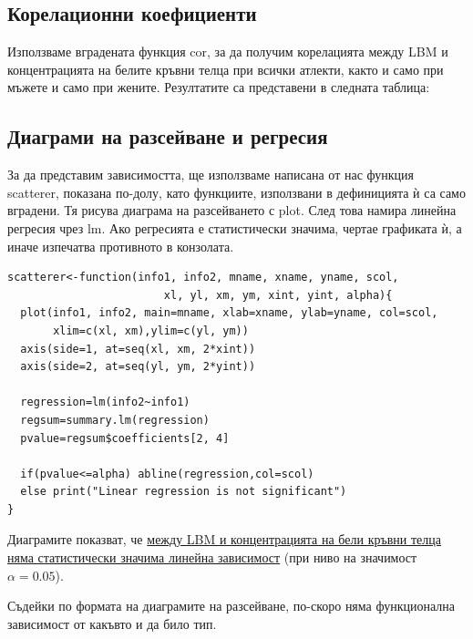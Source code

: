 \documentclass[12pt]{article}
\begin{document}
\begin{large}
\subsection{Корелационни коефициенти}
Използваме вградената функция cor, за да получим корелацията 
между LBM и концентрацията на белите кръвни телца при всички атлекти, както и само при мъжете и само при жените. Резултатите са представени в следната таблица:

\subsection{Диаграми на разсейване и регресия}
За да представим зависимостта, ще използваме написана от нас функция scatterer, показана по-долу, като функциите, използвани в дефиницията ѝ са само вградени. Тя рисува диаграма на разсейването с plot. След това намира линейна регресия чрез lm. Ако регресията е статистически значима, чертае графиката ѝ, а иначе изпечатва противното в конзолата.

\begin{verbatim}
scatterer<-function(info1, info2, mname, xname, yname, scol,
                    	xl, yl, xm, ym, xint, yint, alpha){
  plot(info1, info2, main=mname, xlab=xname, ylab=yname, col=scol,
       xlim=c(xl, xm),ylim=c(yl, ym))
  axis(side=1, at=seq(xl, xm, 2*xint))
  axis(side=2, at=seq(yl, ym, 2*yint))
  
  regression=lm(info2~info1)
  regsum=summary.lm(regression)
  pvalue=regsum$coefficients[2, 4]
  
  if(pvalue<=alpha) abline(regression,col=scol)
  else print("Linear regression is not significant")
}
\end{verbatim}


Диаграмите показват, че \uline{между LBM и концентрацията на бели кръвни телца няма статистически значима линейна зависимост} (при ниво на значимост $\alpha=0.05$). \par
Съдейки по формата на диаграмите на разсейване, по-скоро няма функционална зависимост от какъвто и да било тип.


\end{large}
\end{document}
